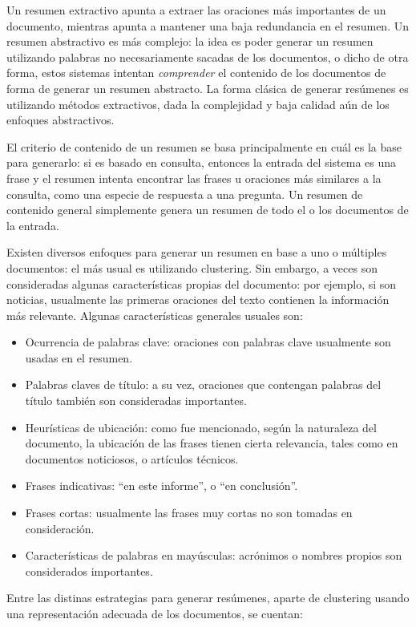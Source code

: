    Un resumen extractivo apunta a
   extraer las oraciones más importantes de un documento, mientras
   apunta a mantener una baja redundancia en el resumen. Un resumen
   abstractivo es más complejo: la idea es poder generar un resumen
   utilizando palabras no necesariamente sacadas de los documentos, o
   dicho de otra forma, estos sistemas intentan \emph{comprender} el
   contenido de los documentos de forma de generar un resumen
   abstracto. La forma clásica de generar resúmenes es utilizando
   métodos extractivos, dada la complejidad y baja calidad aún de los
   enfoques abstractivos.

   El criterio de contenido de un resumen se basa principalmente en
   cuál es la base para generarlo: si es basado en consulta, entonces
   la entrada del sistema es una frase y el resumen intenta encontrar
   las frases u oraciones más similares a la consulta, como una
   especie de respuesta a una pregunta. Un resumen de contenido
   general simplemente genera un resumen de todo el o los documentos
   de la entrada.

   Existen diversos enfoques para generar un resumen en base a uno o
   múltiples documentos: el más usual es utilizando clustering. Sin
   embargo, a veces son consideradas algunas características propias
   del documento: por ejemplo, si son noticias, usualmente las
   primeras oraciones del texto contienen la información más
   relevante\cite{DBLP:conf:spire:Bravo-MarquezM12}. Algunas
   características generales usuales son:

\begin{itemize}
\item Ocurrencia de palabras clave: oraciones con palabras
     clave usualmente son usadas en el resumen.
\item Palabras claves de título: a su vez, oraciones que contengan
     palabras del título también son consideradas importantes.
\item Heurísticas de ubicación: como fue mencionado, según la
     naturaleza del documento, la ubicación de las frases tienen
     cierta relevancia, tales como en documentos noticiosos, o
     artículos técnicos.
\item Frases indicativas: ``en este informe'', o ``en conclusión''.
\item Frases cortas: usualmente las frases muy cortas no son tomadas en
     consideración.
\item Características de palabras en mayúsculas: acrónimos o nombres
     propios son considerados importantes.
\end{itemize}
   Entre las distinas estrategias para generar resúmenes, aparte de
   clustering usando una representación adecuada de los documentos, se
   cuentan:

